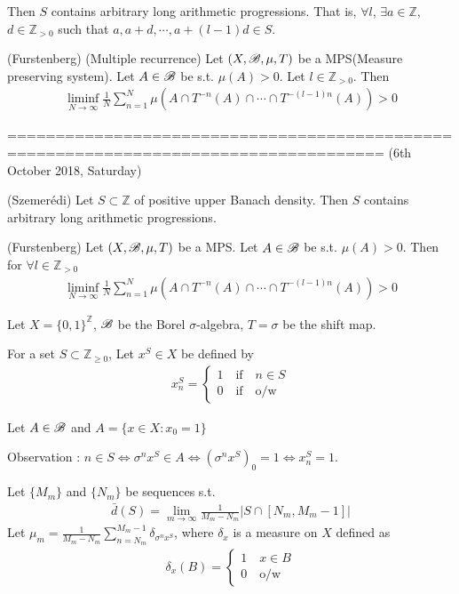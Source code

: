 \documentclass[10pt,a4paper]{report}
\begin{document}
Then $S$ contains arbitrary long arithmetic progressions. That is, $\forall l$, $\exists a \in \mathbb{Z}$, $d\in \mathbb{Z}_{>0}$ such that $a, a+d, \cdots, a+(l-1)d \in S$.
\s

\thm (Furstenberg) (Multiple recurrence) Let $(X,\mathscr{B},\mu, T)$ be a MPS(Measure preserving system). Let $A \in \mathscr{B}$ be s.t. $\mu(A) >0$. Let $l\in \mathbb{Z}_{>0}$. Then
\begin{align*}
\liminf_{N\rightarrow \infty} \frac{1}{N} \sum_{n=1}^N \mu(A\cap T^{-n}(A) \cap \cdots \cap T^{-(l-1)n}(A))>0
\end{align*}
\s

=====================================================================================
(6th October 2018, Saturday)
\s

\thm (Szemer\'{e}di) Let $S \subset \mathbb{Z}$ of positive upper Banach density. Then $S$ contains arbitrary long arithmetic progressions. \s

\thm (Furstenberg) Let $(X,\mathscr{B},\mu, T)$ be a MPS. Let $A \in \mathscr{B}$ be s.t. $\mu(A) >0$. Then for $\forall l\in \mathbb{Z}_{>0}$
\begin{align*}
\liminf_{N\rightarrow \infty} \frac{1}{N} \sum_{n=1}^N \mu(A\cap T^{-n}(A) \cap \cdots \cap T^{-(l-1)n}(A))>0
\end{align*}
\s
\s

Let $X =\{0,1\}^{\mathbb{Z}}$, $\mathscr{B}$ be the Borel $\sigma$-algebra, $T=\sigma$ be the shift map.

For a set $S \subset \mathbb{Z}_{\geq 0}$, Let $x^S \in X$ be defined by
\begin{align*}
x_n^S =\begin{cases}
1 \quad \text{if} \quad n\in S\\
0 \quad \text{if} \quad \text{o/w} 
\end{cases}
\end{align*}

Let $A \in \mathscr{B}$ and $A = \{x\in X:x_0=1 \}$

Observation : $n\in S \Leftrightarrow \sigma^n x^S \in A \Leftrightarrow (\sigma^n x^S)_0=1 \Leftrightarrow x_n^S =1$.

Let $\{M_m\}$ and $\{N_m\}$ be sequences s.t.
\begin{align*}
\bar{d}(S) = \lim_{m\rightarrow \infty} \frac{1}{M_m - N_m} \big|S \cap [N_m,M_m-1] \big|
\end{align*}
Let $\mu_m = \frac{1}{M_m - N_m} \sum_{n=N_m}^{M_m-1} \delta_{\sigma^n x^S}$, where $\delta_x$ is a measure on $X$ defined as
\begin{align*}
\delta_x(B) = \begin{cases}
1 \quad x\in B \\
0 \quad \text{o/w}
\end{cases}
\end{align*}
\end{document}
